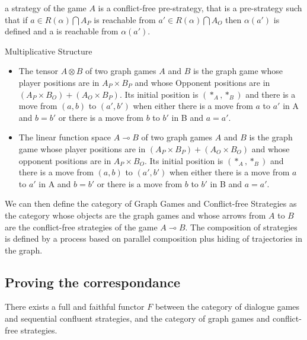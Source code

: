 \documentclass[a4paper,UKenglish]{lipics}
\begin{document}
\begin{definition}
a strategy of the game $A$ is a conflict-free pre-strategy, that is a pre-strategy such that if $a \in R(\alpha)\bigcap A_P$ is reachable from $a' \in R(\alpha)\bigcap A_O$ then $\alpha (a')$ is defined and a is reachable from $\alpha(a')$. 
\end{definition}

\begin{definition}{Multiplicative Structure}
\begin{itemize}
\item The tensor $A\otimes B$ of two graph games $A$ and $B$ is the graph game whose player positions are in $A_P \times B_P$ and whose Opponent positions are in $(A_P \times B_O) + (A_O \times B_P)$. Its initial position is $ (*_A, *_B)$ and there is a move from $(a,b)$ to $(a',b')$ when either there is a move from $a$ to $a'$ in A and $b=b'$ or there is a move from $b$ to $b'$ in B and $a=a'$.\\
\item The linear function space $A \multimap B$ of two graph games $A$ and $B$ is the graph game whose player positions are in $(A_P \times B_P) + (A_O \times B_O)$ and whose opponent positions are in $A_P \times B_O$. Its initial position is $ (*_A, *_B)$ and there is a move from $(a,b)$ to $(a',b')$ when either there is a move from $a$ to $a'$ in A and $b=b'$ or there is a move from $b$ to $b'$ in B and $a=a'$.\\
\end{itemize}
\end{definition}

We can then define the category of Graph Games and Conflict-free Strategies as the category whose objects are the graph games and whose arrows from $A$ to $B$ are the conflict-free strategies of the game $A\multimap B$. The composition of strategies is defined by a process based on parallel composition plus hiding of trajectories in the graph.
  
\subsection{Proving the correspondance}
\begin{theorem}
There exists a full and faithful functor $F$ between the category of dialogue games and sequential confluent strategies, and the category of graph games and conflict-free strategies.
\end{theorem} 
\end{document}
